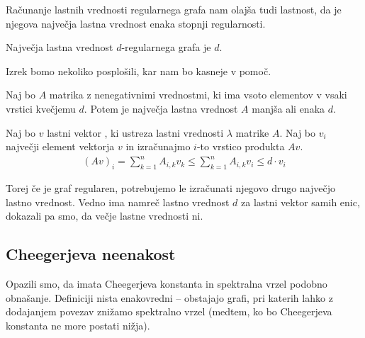 Računanje lastnih vrednosti regularnega grafa nam olajša tudi lastnost, da je njegova največja lastna vrednost enaka stopnji regularnosti.
\begin{izrek}
    Največja lastna vrednost \(d\)-regularnega grafa je \(d\).
\end{izrek}

Izrek bomo nekoliko posplošili, kar nam bo kasneje v pomoč.
\begin{izrek}\label{def-najvecja-lv}
    Naj bo \(A\) matrika z nenegativnimi vrednostmi, ki ima vsoto elementov v vsaki vrstici kvečjemu \(d\). Potem je največja lastna vrednost \(A\) manjša ali enaka \(d\).
\end{izrek}
\begin{dokaz}
    Naj bo \(v\) lastni vektor , ki ustreza lastni vrednosti \(\lambda\) matrike \(A\). Naj bo \(v_i\) največji element vektorja \(v\) in izračunajmo \(i\)-to vrstico produkta \(Av\).
    \begin{align*}
        (Av)_i = \sum_{k=1}^n A_{i,k}v_k \leq \sum_{k=1}^n A_{i,k}v_i \leq d\cdot v_i
    \end{align*}
\end{dokaz}
%
Torej če je graf regularen, potrebujemo le izračunati njegovo drugo največjo lastno vrednost. Vedno ima namreč lastno vrednost \(d\) za lastni vektor samih enic, dokazali pa smo, da večje lastne vrednosti ni.
\subsection{Cheegerjeva neenakost}
Opazili smo, da imata Cheegerjeva konstanta in spektralna vrzel podobno obnašanje. Definiciji nista enakovredni -- obstajajo grafi, pri katerih lahko z dodajanjem povezav znižamo spektralno vrzel (medtem, ko bo Cheegerjeva konstanta ne more postati nižja).

